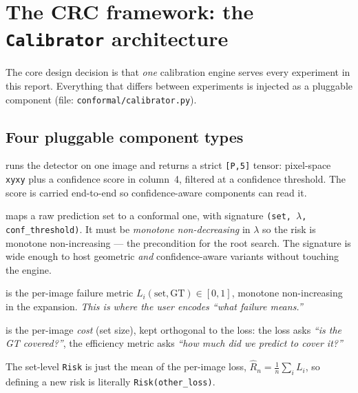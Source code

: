\documentclass[11pt,a4paper]{article}
\newcommand{\code}[1]{\texttt{\small #1}}
\begin{document}
\section{The CRC framework: the \texttt{Calibrator} architecture}
The core design decision is that \emph{one} calibration engine serves every
experiment in this report. Everything that differs between experiments is
injected as a pluggable component (file: \code{conformal/calibrator.py}).

\subsection{Four pluggable component types}
\begin{description}[leftmargin=1.4cm,style=nextline]
  \item[\code{PredictionFunction}] runs the detector on one image and returns a
    strict \code{[P,5]} tensor: pixel-space \code{xyxy} plus a confidence score
    in column~4, filtered at a confidence threshold. The score is carried
    end-to-end so confidence-aware components can read it.
  \item[\code{ExpansionFunction}] maps a raw prediction set to a conformal one,
    with signature \code{(set, $\lambda$, conf\_threshold)}. It must be
    \emph{monotone non-decreasing} in $\lambda$ so the risk is monotone
    non-increasing --- the precondition for the root search. The signature is
    wide enough to host geometric \emph{and} confidence-aware variants without
    touching the engine.
  \item[\code{LossFunction}] is the per-image failure metric
    $L_i(\text{set},\text{GT}) \in [0,1]$, monotone non-increasing in the
    expansion. \emph{This is where the user encodes ``what failure means.''}
  \item[\code{EfficiencyMetric}] is the per-image \emph{cost} (set size), kept
    orthogonal to the loss: the loss asks \emph{``is the GT covered?''}, the
    efficiency metric asks \emph{``how much did we predict to cover it?''}
\end{description}
The set-level \code{Risk} is just the mean of the per-image loss,
$\hat{R}_n = \tfrac1n\sum_i L_i$, so defining a new risk is literally
\code{Risk(other\_loss)}.
\end{document}
